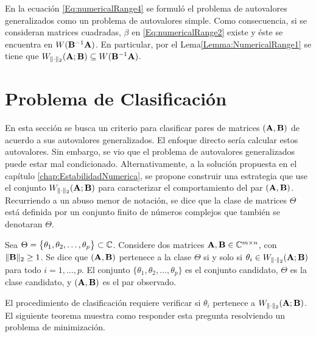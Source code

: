 		En la ecuación \eqref{Eq:numericalRange4} se formuló el problema de autovalores generalizados como un problema de autovalores simple. Como consecuencia, si se consideran matrices cuadradas, $\beta$ en \eqref{Eq:numericalRange2} existe y éste se encuentra en $W(\mathbf{B}^{-1}\mathbf{A})$. En particular, por el Lema\ref{Lemma:NumericalRange1} se tiene que $W_{\|\cdot\|_2}(\mathbf{A};\mathbf{B})\subseteq W(\mathbf{B}^{-1}\mathbf{A})$.
		
	\section{Problema de Clasificación}  
	
		En esta sección se busca un criterio para clasificar pares de matrices $(\mathbf{A},\mathbf{B})$ de acuerdo a sus autovalores generalizados. El enfoque directo sería calcular estos autovalores. Sin embargo, se vio que el problema de autovalores generalizados puede estar mal condicionado. Alternativamente, a la solución propuesta en el capítulo \eqref{chap:EstabilidadNumerica}, se propone construir una estrategia que use el conjunto $W_{\|\cdot\|_2}(\mathbf{A};\mathbf{B})$ para caracterizar el comportamiento del par $(\mathbf{A},\mathbf{B})$. Recurriendo a un abuso menor de notación, se dice que la clase de matrices $\Theta$ está definida por un conjunto finito de números complejos que también se denotaran $\Theta$.
		
		\begin{definition}\label{Def:numericalRange}
			Sea $\Theta = \big\{\theta_1,\theta_2,\ldots,\theta_p\big\}\subset\mathbb{C}$. Considere dos matrices $\mathbf{A},\mathbf{B}\in\mathbb{C}^{m\times n}$, con $\|\mathbf{B}\|_2\ge 1$. Se dice que $(\mathbf{A},\mathbf{B})$ pertenece a la clase $\Theta$ si y solo si $\theta_i\in W_{\|\cdot\|_2}(\mathbf{A};\mathbf{B})$ para todo $i=1,\ldots,p$.
			El conjunto $\big\{\theta_1,\theta_2,\ldots,\theta_p\big\}$ es el conjunto candidato, $\Theta$ es la clase candidato, y $(\mathbf{A},\mathbf{B})$ es el par observado.
		\end{definition}
		
		El procedimiento de clasificación requiere verificar si $\theta_i$ pertenece a $W_{\|\cdot\|_2}(\mathbf{A};\mathbf{B})$. El siguiente teorema muestra como responder esta pregunta resolviendo un problema de minimización.
		
